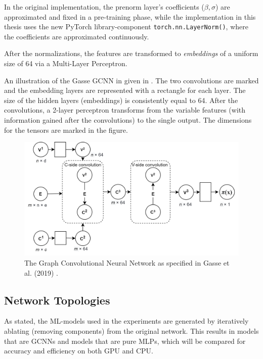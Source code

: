 In the original implementation, the prenorm layer's coefficients ($\beta, \sigma$) are approximated and fixed in a pre-training phase, while the implementation in this thesis uses the new PyTorch library-component \verb|torch.nn.LayerNorm()|, where the coefficients are approximated continuously.     

After the normalizations, the features are transformed to \textit{embeddings} of a uniform size of 64 via a Multi-Layer Perceptron. 

An illustration of the Gasse \gls{GCNN} in given in . The two convolutions are marked and the embedding layers are represented with a rectangle for each layer. The size of the hidden layers (embeddings) is consistently equal to 64. After the convolutions, a 2-layer perceptron transforms from the variable features (with information gained after the convolutions) to the single output. The dimensions for the tensors are marked in the figure. 
\begin{figure}
    \centering
    \includegraphics[width=\linewidth]{img/gnn_2.png}
    \caption{The Graph Convolutional Neural Network as specified in Gasse et al. (2019) \cite{gasse2019exact}.}
    \label{fig:gnn2}
\end{figure}






\subsection{Network Topologies}

As stated, the \gls{ML}-models used in the experiments are generated by iteratively ablating (removing components) from the original network. This results in models that are \gls{GCNN}s and models that are pure \gls{MLP}s, which will be compared for accuracy and efficiency on both \gls{GPU} and \gls{CPU}. 


